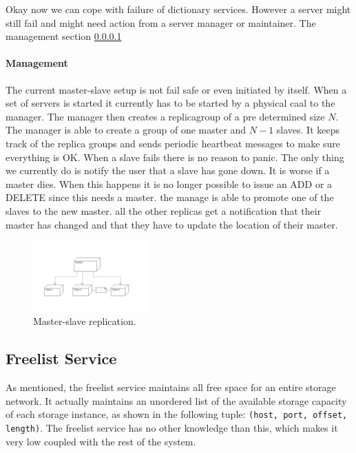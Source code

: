 \documentclass[12pt,a4paper]{scrartcl}
\begin{document}
Okay now we can cope with failure of dictionary services. However a server might still fail and might need action from a server manager or maintainer. The management section \ref{sec:management-dictionary}

\paragraph{Management}
\label{sec:management-dictionary}
The current master-slave setup is not fail safe or even initiated by itself. When a set of servers is started it currently has to be started by a physical caal to the manager. The manager then creates a replicagroup of a pre determined size $N$. The manager is able to create a group of one master and $N-1$ slaves. It keeps track of the replica groups and sends periodic heartbeat messages to make sure everything is OK. When a slave fails there is no reason to panic. The only thing we currently do is notify the user that a slave has gone down. It is worse if a master dies. When this happens it is no longer possible to issue an ADD or a DELETE since this needs a master. the manage is able to promote one of the slaves to the new master. all the other replicas get a notification that their master has changed and that they have to update the location of their master.

\begin{figure}[H]
\centering
\includegraphics[width=0.4\textwidth]{diagrams/MasterSlave.png}
\caption{Master-slave replication.}
\label{fig:master-slave}
\end{figure}



\subsection{Freelist Service}
\label{sec:freelist}
As mentioned, the freelist service maintains all free space for an entire storage network. It actually maintains an unordered list of the available storage capacity of each storage instance, as shown in the following tuple: \verb|(host, port, offset, length)|. The freelist service has no other knowledge than this, which makes it very low coupled with the rest of the system.
\end{document}
